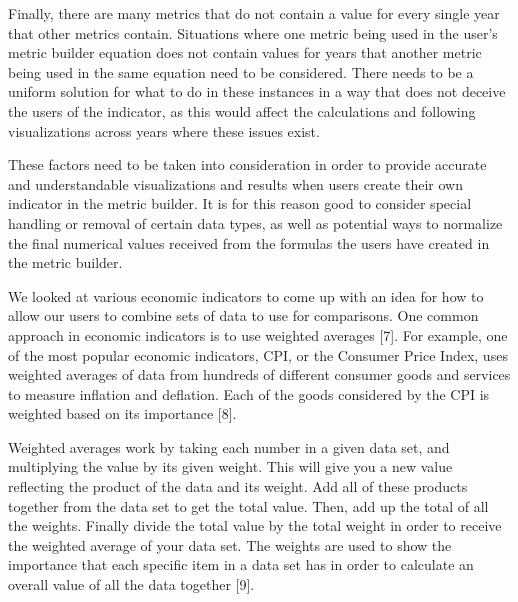 Finally, there are many metrics that do not contain a value for every single year that other metrics contain. Situations where one metric being used in the user’s metric builder equation does not contain values for years that another metric being used in the same equation need to be considered. There needs to be a uniform solution for what to do in these instances in a way that does not deceive the users of the indicator, as this would affect the calculations and following visualizations across years where these issues exist.

These factors need to be taken into consideration in order to provide accurate and understandable visualizations and results when users create their own indicator in the metric builder. It is for this reason good to consider special handling or removal of certain data types, as well as potential ways to normalize the final numerical values received from the formulas the users have created in the metric builder.

We looked at various economic indicators to come up with an idea for how to allow our users to combine sets of data to use for comparisons. One common approach in economic indicators is to use weighted averages [7]. For example, one of the most popular economic indicators, CPI, or the Consumer Price Index, uses weighted averages of data from hundreds of different consumer goods and services to measure inflation and deflation. Each of the goods considered by the CPI is weighted based on its importance [8].

Weighted averages work by taking each number in a given data set, and multiplying the value by its given weight. This will give you a new value reflecting the product of the data and its weight. Add all of these products together from the data set to get the total value. Then, add up the total of all the weights. Finally divide the total value by the total weight in order to receive the weighted average of your data set. The weights are used to show the importance that each specific item in a data set has in order to calculate an overall value of all the data together [9].
